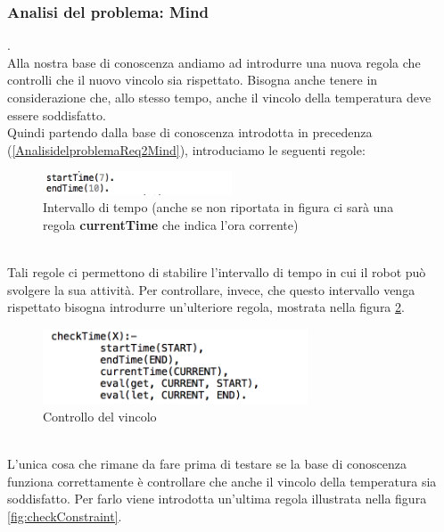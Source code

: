 \documentclass{llncs}
\begin{document}
\subsubsection{Analisi del problema: Mind} .
\label{AnalisidelproblemaReq3Mind}
\vspace*{1ex}
\\
Alla nostra base di conoscenza andiamo ad introdurre una nuova regola che controlli che il nuovo vincolo sia rispettato. Bisogna anche tenere in considerazione che, allo stesso tempo, anche il vincolo della temperatura deve essere soddisfatto.\\
Quindi partendo dalla base di conoscenza introdotta in precedenza (\hyperref[AnalisidelproblemaReq2Mind]{\ref{AnalisidelproblemaReq2Mind}}), introduciamo le seguenti regole:\\
\begin{figure}
    \centering
    \includegraphics[width=0.5\textwidth]{Immagini/Requisito3/StartEndReq3.png}
    \caption{Intervallo di tempo (anche se non riportata in figura ci sar\`a una regola \textbf{currentTime} che indica l'ora corrente)}
    \label{fig:my_label}
\end{figure}
\vspace*{1ex}
\\
Tali regole ci permettono di stabilire l'intervallo di tempo in cui il robot pu\`o svolgere la sua attivit\`a. Per controllare, invece, che questo intervallo venga rispettato bisogna introdurre un'ulteriore regola, mostrata nella figura \hyperref[fig:checkTime]{\ref{fig:checkTime}}. \\
\begin{figure}
    \centering
    \includegraphics[width=0.7\textwidth]{Immagini/Requisito3/checkTimeReq3.png}
    \caption{Controllo del vincolo}
    \label{fig:checkTime}
\end{figure}
\vspace*{1ex}
\\
L'unica cosa che rimane da fare prima di testare se la base di conoscenza funziona correttamente \`e controllare che anche il vincolo della temperatura sia soddisfatto. Per farlo viene introdotta un'ultima regola illustrata nella figura \hyperref[fig:checkConstraint]{\ref{fig:checkConstraint}}.\\
\end{document}
